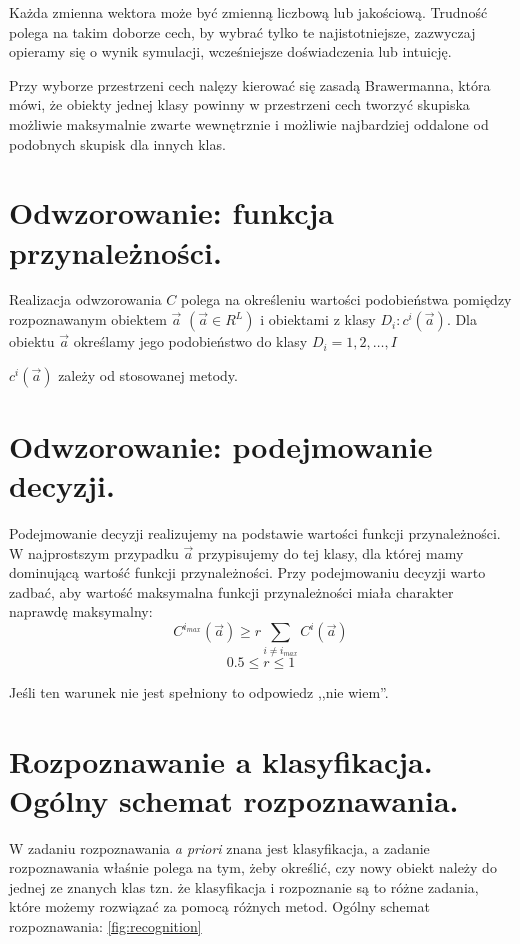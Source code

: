 \documentclass[a4paper,10pt]{article}
\begin{document}
Każda zmienna wektora może być zmienną liczbową lub jakościową. Trudność polega na takim doborze cech, by wybrać tylko te najistotniejsze, zazwyczaj opieramy się o wynik symulacji, wcześniejsze doświadczenia lub intuicję.

Przy wyborze przestrzeni cech nalęzy kierować się zasadą Brawermanna, która mówi, że obiekty jednej klasy powinny w przestrzeni cech tworzyć skupiska możliwie maksymalnie zwarte wewnętrznie i możliwie najbardziej oddalone od podobnych skupisk dla innych klas.

\section{Odwzorowanie: funkcja przynależności.}
Realizacja odwzorowania $C$ polega na określeniu wartości podobieństwa pomiędzy rozpoznawanym obiektem $\overrightarrow{a}$ $(\overrightarrow{a} \in R^L)$ i obiektami z klasy $D_i: c^i(\overrightarrow{a})$. Dla obiektu $\overrightarrow{a}$ określamy jego podobieństwo do klasy $D_i = 1, 2, \ldots, I$

$c^i(\overrightarrow{a})$ zależy od stosowanej metody.

\section{Odwzorowanie: podejmowanie decyzji.}
Podejmowanie decyzji realizujemy na podstawie wartości funkcji przynależności. W najprostszym przypadku $\overrightarrow{a}$ przypisujemy do tej klasy, dla której mamy dominującą wartość funkcji przynależności. Przy podejmowaniu decyzji warto zadbać, aby wartość maksymalna funkcji przynależności miała charakter naprawdę maksymalny:
\begin{equation}
C^{i_{max}}(\overrightarrow{a}) \geq r \sum_{i \neq i_{max}} C^i(\overrightarrow{a})
\end{equation}
\begin{equation}
 0.5 \leq r \leq 1
\end{equation}

Jeśli ten warunek nie jest spełniony to odpowiedz ,,nie wiem''.

\section{Rozpoznawanie a klasyfikacja. Ogólny schemat rozpoznawania.}
W zadaniu rozpoznawania \textit{a priori} znana jest klasyfikacja, a zadanie rozpoznawania właśnie polega na tym, żeby określić, czy nowy obiekt należy do jednej ze znanych klas tzn. że klasyfikacja i rozpoznanie są to różne zadania, które możemy rozwiązać za pomocą różnych metod.
Ogólny schemat rozpoznawania: \ref{fig:recognition}
\end{document}
